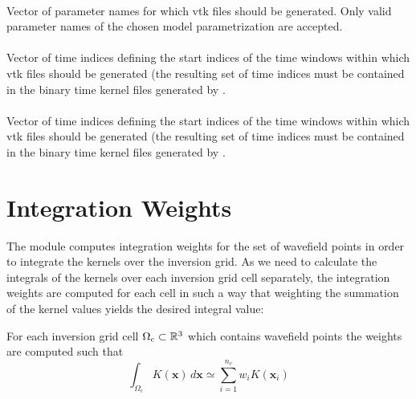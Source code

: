 \paragraph{}
Vector of parameter names for which vtk files should be generated. Only valid parameter names of the chosen model parametrization are accepted. 
\paragraph{}
Vector of  time indices defining the start indices of the  time windows within which vtk files 
should be generated (the resulting set of time indices must be contained in the binary time kernel files generated by 
.
\paragraph{}
Vector of  time indices defining the start indices of the  time windows within which vtk files 
should be generated (the resulting set of time indices must be contained in the binary time kernel files generated by 
.
%
%
\section{Integration Weights} \label{programs_scripts,sec:fmod_intw}
%
The \ASKI module  computes integration weights for the set of wavefield points 
in order to integrate the kernels over the inversion grid. As we need to calculate the integrals of the 
kernels over each inversion grid cell separately, the integration weights are computed for each cell in 
such a way that weighting the summation of the kernel values yields the desired integral value:

For each inversion grid cell $\Omega_c \subset \mathbb{R}^3$ which contains wavefield points \wpG the weights 
\weights are computed such that
\begin{equation} \label{programs_scripts,sec:fmod_intw,eq:integration_global}
\int_{\Omega_c} K(\mathbf{x})\,d\mathbf{x} \simeq \sum_{i=1}^{n_c} w_iK(\mathbf{x}_i)
\end{equation}


